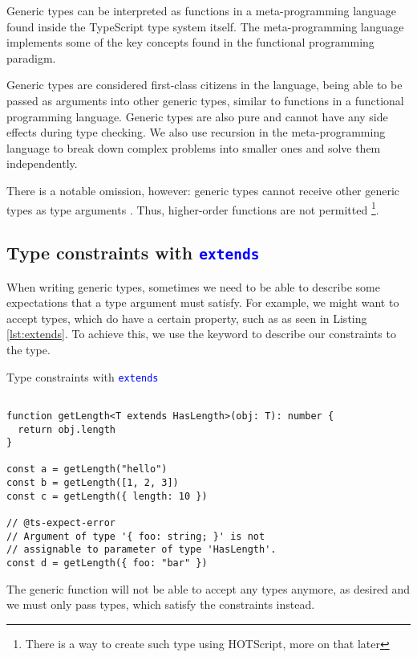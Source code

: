 Generic types can be interpreted as functions in a meta-programming language found inside the TypeScript type system itself. The meta-programming language implements some of the key concepts found in the functional programming paradigm.

Generic types are considered first-class citizens in the language, being able to be passed as arguments into other generic types, similar to functions in a functional programming language. Generic types are also pure and cannot have any side effects during type checking. We also use recursion in the meta-programming language to break down complex problems into smaller ones and solve them independently.

There is a notable omission, however: generic types cannot receive other generic types as type arguments \cite{TypeInferenceHigherorder}. Thus, higher-order functions are not permitted \footnote{There is a way to create such type using HOTScript, more on that later}.

\subsection{Type constraints with \texttt{\textcolor{blue}{extends}}}

When writing generic types, sometimes we need to be able to describe some expectations that a type argument must satisfy. For example, we might want to accept types, which do have a certain property, such as  as seen in Listing \ref{lst:extends}. To achieve this, we use the  keyword to describe our constraints to the type.

\begin{listing}[h]
  \caption{Type constraints with \texttt{\textcolor{blue}{extends}}}\label{lst:extends}
  \begin{verbatim}

function getLength<T extends HasLength>(obj: T): number {
  return obj.length
}

const a = getLength("hello")
const b = getLength([1, 2, 3])
const c = getLength({ length: 10 })

// @ts-expect-error 
// Argument of type '{ foo: string; }' is not 
// assignable to parameter of type 'HasLength'.
const d = getLength({ foo: "bar" })
\end{verbatim}
\end{listing}

The generic function will not be able to accept any types anymore, as desired and we must only pass types, which satisfy the constraints instead.

